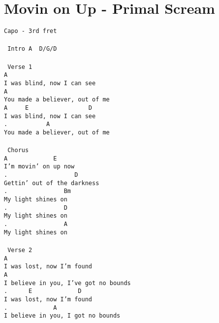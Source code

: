 \newpage
\section{Movin on Up - Primal Scream}
\label{Movin on Up - Primal Scream}
\texttt{Capo\ -\ 3rd\ fret\\
\\
\lbrack\ Intro\rbrack\ 
A\ \ D/G/D\\
\\
\lbrack\ Verse\ 1\rbrack\\
A\ \\
I\ was\ blind,\ now\ I\ can\ see\\
A\\
You\ made\ a\ believer,\ out\ of\ me\\
A\ \ \ \ \ E\ \ \ \ \ \ \ \ \ \ \ \ \ \ \ \ \ D\\
I\ was\ blind,\ now\ I\ can\ see\\
.\ \ \ \ \ \ \ \ \ \ \ A\ \ \ \ \ \ \ \ \ \ \ \ \ \ \ \ \\
You\ made\ a\ believer,\ out\ of\ me\\
\\
\lbrack\ Chorus\rbrack\\
A\ \ \ \ \ \ \ \ \ \ \ \ \ E\\
I'm\ movin'\ on\ up\ now\\
.\ \ \ \ \ \ \ \ \ \ \ \ \ \ \ \ \ \ \ D\\
Gettin'\ out\ of\ the\ darkness\\
.\ \ \ \ \ \ \ \ \ \ \ \ \ \ \ \ Bm\\
My\ light\ shines\ on\\
.\ \ \ \ \ \ \ \ \ \ \ \ \ \ \ \ D\\
My\ light\ shines\ on\\
.\ \ \ \ \ \ \ \ \ \ \ \ \ \ \ \ A\\
My\ light\ shines\ on\\
\\
\lbrack\ Verse\ 2\rbrack\\
A\\
I\ was\ lost,\ now\ I'm\ found\\
A\\
I\ believe\ in\ you,\ I've\ got\ no\ bounds\\
.\ \ \ \ \ \ E\ \ \ \ \ \ \ \ \ \ \ \ \ D\\
I\ was\ lost,\ now\ I'm\ found\\
.\ \ \ \ \ \ \ \ \ \ \ \ \ A\\
I\ believe\ in\ you,\ I\ got\ no\ bounds\\
}
